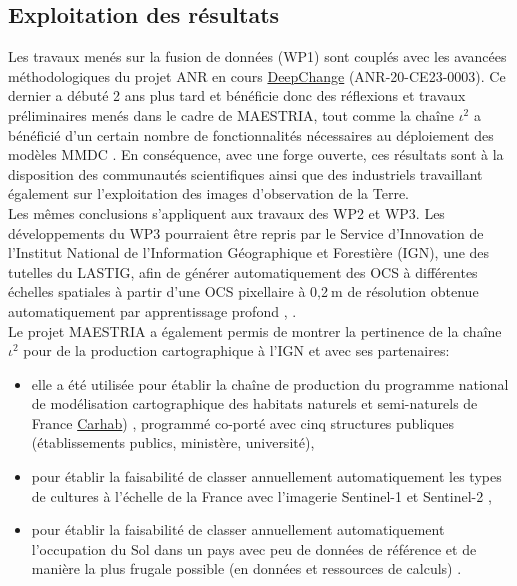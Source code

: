 \subsection{Exploitation des résultats}
Les travaux menés sur la fusion de données (WP1) sont couplés avec les avancées méthodologiques du projet ANR en cours \href{https://anr.hal.science/search/index/?q=*&anrProjectReference_s=ANR-20-CE23-0003}{DeepChange} (ANR-20-CE23-0003). Ce dernier a débuté 2 ans plus tard et bénéficie donc des réflexions et travaux préliminaires menés dans le cadre de MAESTRIA, tout comme la chaîne $\iota^2$ a bénéficié d'un certain nombre de fonctionnalités nécessaires au déploiement des modèles MMDC \cite{zerah-2023-physic-driven}. En conséquence, avec une forge ouverte, ces résultats sont à la disposition des communautés scientifiques ainsi que des industriels travaillant également sur l'exploitation des images d'observation de la Terre.\\
Les mêmes conclusions s'appliquent aux travaux des WP2 et WP3. Les développements du WP3 pourraient être repris par le Service d'Innovation de l'Institut National de l'Information Géographique et Forestière (IGN), une des tutelles du LASTIG, afin de générer automatiquement des OCS à différentes échelles spatiales à partir d'une OCS pixellaire à 0,2$\:$m de résolution obtenue automatiquement par apprentissage profond \cite{garioud2023flair}, \cite{garioud2023flair2}.\\

Le projet MAESTRIA a également permis de montrer la pertinence de la chaîne $\iota^2$ pour de la production cartographique à l'IGN et avec ses partenaires:
\begin{itemize}
    \item elle a été utilisée pour établir la chaîne de production du programme national de modélisation cartographique des habitats naturels et semi-naturels de France \href{https://inpn.mnhn.fr/programme/carhab}{Carhab}) \cite{Aussel}, programmé co-porté avec cinq structures publiques (établissements publics, ministère, université),
    \item pour établir la faisabilité de classer annuellement automatiquement les types de cultures à l'échelle de la France avec l'imagerie Sentinel-1 et Sentinel-2 \cite{Nico_RSL},
     \item pour établir la faisabilité de classer annuellement automatiquement l'occupation du Sol dans un pays avec peu de données de référence et de manière la plus frugale possible (en données et ressources de calculs) \cite{Hermann_ISPRS22}.
\end{itemize} 


